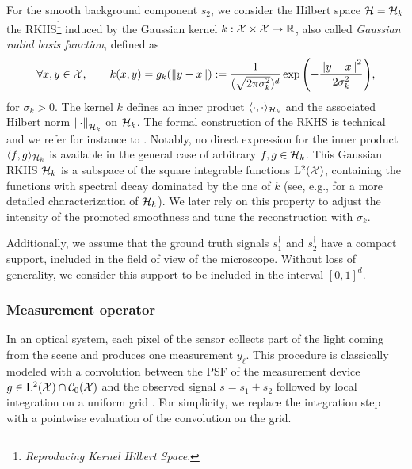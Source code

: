
            For the smooth background component $s_2$, we consider the Hilbert space $\mathcal{H} = \mathcal{H}_k$ the RKHS\footnote{\textit{Reproducing Kernel Hilbert Space}.} induced by the Gaussian kernel $k: \mathcal{X} \times \mathcal{X} \to \mathbb{R}$, also called \emph{Gaussian radial basis function}, defined as
            \begin{equation*}
                \forall x, y \in \mathcal{X}, \qquad k(x, y) = g_k(\left\lVert y - x\right\rVert) := \frac{1}{(\sqrt{2\pi\sigma_k^2})^d} \exp{ \left({-\frac{\left\lVert y - x\right\rVert^2}{2 \sigma_k^2}}\right)},
            \end{equation*}
            for $\sigma_k > 0$. The kernel $k$ defines an inner product $\langle \cdot, \cdot \rangle_{\mathcal{H}_k}$ and the associated Hilbert norm $\left\lVert\cdot\right\rVert_{\mathcal{H}_k}$ on $\mathcal{H}_k$. The formal construction of the RKHS is technical and we refer for instance to \cite[Chapter~10]{wendland2004}. Notably, no direct expression for the inner product  $\langle f, g \rangle_{\mathcal{H}_k}$ is available in the general case of arbitrary $f, g \in \mathcal{H}_k$. This Gaussian RKHS $\mathcal{H}_k$ is a subspace of the square integrable functions $\mathrm{L}^2(\mathcal{X})$, containing the functions with spectral decay dominated by the one of $k$ (see, e.g., \cite{minh2010} for a more detailed characterization of $\mathcal{H}_k$). We later rely on this property to adjust the intensity of the promoted smoothness and tune the reconstruction with $\sigma_k$.

            Additionally, we assume that the ground truth signals $s_1^\dagger$ and $ s_2^\dagger$ have a compact support, included in the field of view of the microscope. Without loss of generality, we consider this support to be included in the interval $[0, 1]^d$. 


        \subsubsection{Measurement operator}        
            In an optical system, each pixel of the sensor collects part of the light coming from the scene and produces one measurement $y_\ell$. This procedure is classically modeled with a convolution between the PSF of the measurement device $g \in \mathrm{L}^2(\mathcal{X}) \cap {\mathcal{C}}_0({\mathcal{X}})$ and the observed signal $s = s_1 + s_2$ followed by local integration on a uniform grid \cite{denoyelle2019sliding}. For simplicity, we replace the integration step with a pointwise evaluation of the convolution on the grid.
        
